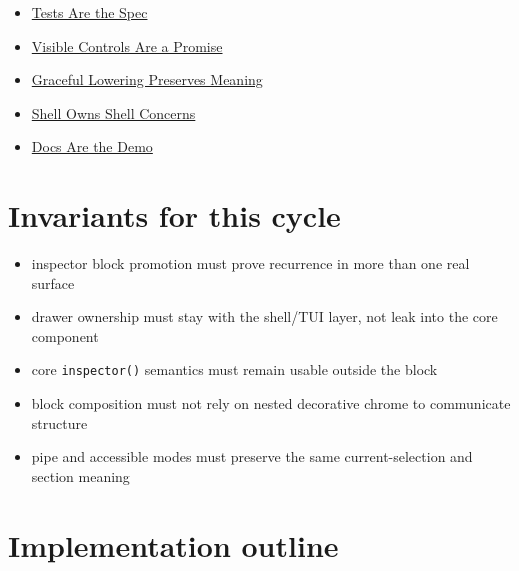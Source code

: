 \begin{itemize}
\tightlist
\item
  \href{https://github.com/flyingrobots/bijou/blob/cbd70612140e7a450d764b3c7be1c6af878b99bc/docs/invariants/tests-are-the-spec.md}{Tests Are the Spec}
\item
  \href{https://github.com/flyingrobots/bijou/blob/cbd70612140e7a450d764b3c7be1c6af878b99bc/docs/invariants/visible-controls-are-a-promise.md}{Visible Controls Are a Promise}
\item
  \href{https://github.com/flyingrobots/bijou/blob/cbd70612140e7a450d764b3c7be1c6af878b99bc/docs/invariants/graceful-lowering-preserves-meaning.md}{Graceful Lowering Preserves Meaning}
\item
  \href{https://github.com/flyingrobots/bijou/blob/cbd70612140e7a450d764b3c7be1c6af878b99bc/docs/invariants/shell-owns-shell-concerns.md}{Shell Owns Shell Concerns}
\item
  \href{https://github.com/flyingrobots/bijou/blob/cbd70612140e7a450d764b3c7be1c6af878b99bc/docs/invariants/docs-are-the-demo.md}{Docs Are the Demo}
\end{itemize}

\section{Invariants for this cycle}\label{record-174-invariants-for-this-cycle}

\begin{itemize}
\tightlist
\item
  inspector block promotion must prove recurrence in more than one real surface
\item
  drawer ownership must stay with the shell/TUI layer, not leak into the core component
\item
  core \texttt{i\allowbreak{}n\allowbreak{}s\allowbreak{}p\allowbreak{}e\allowbreak{}c\allowbreak{}t\allowbreak{}o\allowbreak{}r\allowbreak{}(\allowbreak{})} semantics must remain usable outside the block
\item
  block composition must not rely on nested decorative chrome to communicate structure
\item
  pipe and accessible modes must preserve the same current-selection and section meaning
\end{itemize}

\section{Implementation outline}\label{record-174-implementation-outline}

